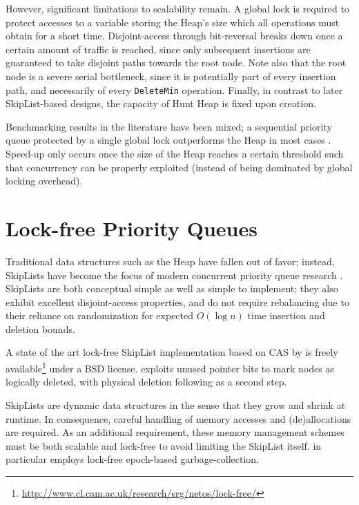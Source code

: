 \documentclass[a4paper,10pt]{article}
\begin{document}
However, significant limitations to scalability remain. A global lock is required
to protect accesses to a variable storing the Heap's size which all operations
must obtain for a short time. Disjoint-access through bit-reversal breaks down
once a certain amount of traffic is reached, since only subsequent insertions
are guaranteed to take disjoint paths towards the root node. Note also that
the root node is a severe serial bottleneck, since it is potentially part of
every insertion path, and necessarily of every \lstinline|DeleteMin| operation.
Finally, in contrast to later SkipList-based designs, the capacity of Hunt Heap
is fixed upon creation.

Benchmarking results in the literature have been mixed; a sequential priority
queue protected by a single global lock outperforms the \citeauthor{hunt1996efficient}
Heap in most cases \cite{hunt1996efficient,sundell2003fast}. Speed-up only occurs once
the size of the Heap reaches a certain threshold such that concurrency
can be properly exploited (instead of being dominated by global locking overhead).

\section{Lock-free Priority Queues}

Traditional data structures such as the Heap have fallen out of favor;
instead, SkipLists \cite{pugh1990skip,pugh1998concurrent} have become the focus
of modern concurrent priority queue research
\cite{shavit2000skiplist,sundell2003fast,herlihy2012art,linden2013skiplist,alistarhspraylist}.
SkipLists are both conceptual simple as well as simple to implement; they also exhibit
excellent disjoint-access properties, and do not require rebalancing due to their
reliance on randomization for expected $O(\log n)$ time insertion and deletion bounds.

A state of the art lock-free SkipList implementation based on \ac{CAS}
by \citeauthor{fraser2004practical} \cite{fraser2004practical} is freely available\footnote{
\url{http://www.cl.cam.ac.uk/research/srg/netos/lock-free/}} under a BSD license.
\citeauthor{fraser2004practical} exploits unused pointer bits to mark nodes as logically
deleted, with physical deletion following as a second step.

SkipLists are dynamic data structures in the sense that they grow and shrink
at runtime. In consequence, careful handling of memory accesses and (de)allocations
are required. As an additional requirement, these memory management schemes must
be both scalable and lock-free to avoid limiting the SkipList itself.
\citeauthor{fraser2004practical} in particular employs lock-free epoch-based garbage-collection.
\end{document}
